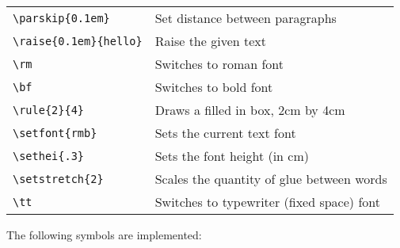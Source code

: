 \begin{tabular}{ll}
\verb+\parskip{0.1em}+      & Set distance between paragraphs \\
\verb+\raise{0.1em}{hello}+ & Raise the given text \\
\verb+\rm+                  & Switches to roman font \\
\verb+\bf+                  & Switches to bold font \\
\verb+\rule{2}{4}+          & Draws a filled in box, 2cm by 4cm \\
\verb+\setfont{rmb}+        & Sets the current text font \\
\verb+\sethei{.3}+          & Sets the font height (in cm) \\
\verb+\setstretch{2}+       & Scales the quantity of glue between words \\
\verb+\tt+                  & Switches to typewriter (fixed space) font \\
\end{tabular}

\vspace{0.5cm}
The following symbols are implemented:
\vspace{0.5cm}

\def\bb{\hfill$\backslash$}

